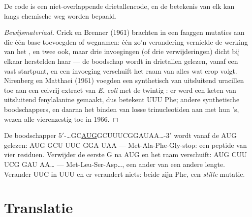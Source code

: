 \begin{proposition}\label{prop:b1:gene-expression:nirenberg}
De code is een niet-overlappende drietallencode, en de betekenis van elk  kan
langs chemische weg worden bepaald.
\end{proposition}
\begin{proof}[Bewijsmateriaal]
Crick en Brenner (1961) brachten in een faaggen mutaties aan die één base
toevoegden of wegnamen: één zo'n verandering vernielde de werking van het , en
twee ook, maar drie invoegingen (of drie verwijderingen) dicht bij elkaar
herstelden haar --- de boodschap wordt in drietallen gelezen, vanaf een vast
startpunt, en een invoeging verschuift het raam van alles wat erop volgt.
Nirenberg en Matthaei (1961) voegden een synthetisch  van uitsluitend uracillen
toe aan een celvrij extract van \emph{E. coli} met de twintig : er werd
een keten van uitsluitend fenylalanine gemaakt, dus betekent UUU Phe; andere
synthetische boodschappers, en daarna het binden van losse trinucleotiden aan
 met hun 's, wezen alle vierenzestig toe in 1966.
\end{proof}

\begin{example}\label{ex:b1:gene-expression:reading}
De boodschapper $5'$-\ldots{}GC\underline{AUG}GCUUUCGGAUAA\ldots{}-$3'$ wordt vanaf
de AUG gelezen: AUG GCU UUC GGA UAA --- Met-Ala-Phe-Gly-stop: een peptide van vier
residuen. Verwijder de eerste G na AUG en het raam verschuift: AUG CUU UCG GAU
AA\ldots{} --- Met-Leu-Ser-Asp\ldots, een ander  van een andere lengte.
Verander UUC in UUU en er verandert niets: beide zijn Phe, een \emph{stille}
mutatie.
\end{example}

\section{Translatie}

